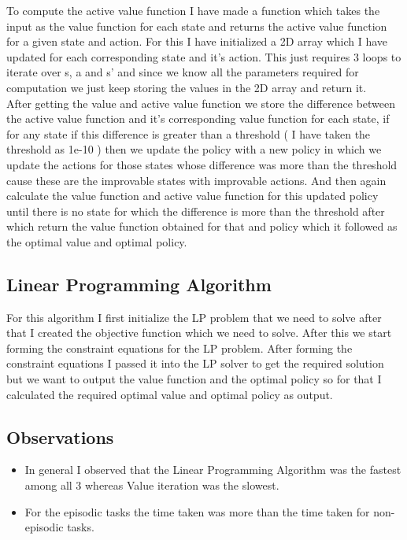 \documentclass{article}
\begin{document}
To compute the active value function I have made a function which takes the input as the value function for each state and returns the active value function for a given state and action. For this I have initialized a 2D array which I have updated for each corresponding state and it's action. This just requires 3 loops to iterate over s, a and s' and since we know all the parameters required for computation we just keep storing the values in the 2D array and return it. \\

After getting the value and active value function we store the difference between the active value function and it's corresponding value function for each state, if for any state if this difference is greater than a threshold ( I have taken the threshold as 1e-10 ) then we update the policy with a new policy in which we update the actions for those states whose difference was more than the threshold cause these are the improvable states with improvable actions. And then again calculate the value function and active value function for this updated policy until there is no state for which the difference is more than the threshold after which return the value function obtained for that and policy which it followed as the optimal value and optimal policy.



\subsection{Linear Programming Algorithm}

For this algorithm I first initialize the LP problem that we need to solve after that I created the objective function which we need to solve. After this we start forming the constraint equations for the LP problem. After forming the constraint equations I passed it into the LP solver to get the required solution but we want to output the value function and the optimal policy so for that I calculated the required optimal value and optimal policy as output.

\subsection{Observations}

\begin{itemize}
\item In general I observed that the Linear Programming Algorithm was the fastest among all 3 whereas Value iteration was the slowest.
\item For the episodic tasks the time taken was more than the time taken for non-episodic tasks.
\end{itemize}
\end{document}

